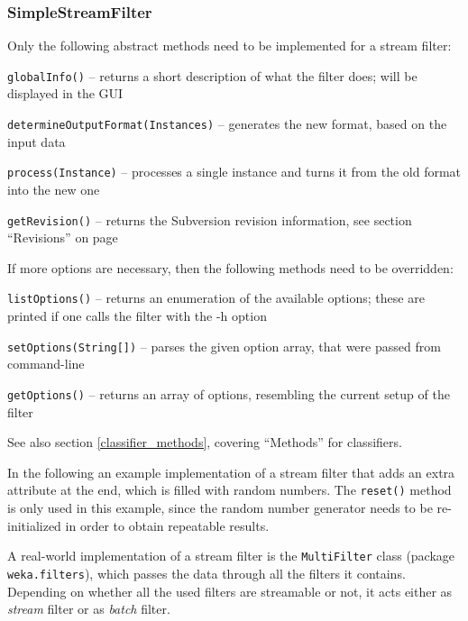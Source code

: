 \subsubsection{SimpleStreamFilter}
Only the following abstract methods need to be implemented for a stream filter:
\begin{tight_itemize}
  \item \texttt{globalInfo()} -- returns a short description of what the filter
does; will be displayed in the GUI
  \item \texttt{determineOutputFormat(Instances)} -- generates the new
format, based on the input data
  \item \texttt{process(Instance)} -- processes a single instance and turns it
from the old format into the new one
  \item \texttt{getRevision()} -- returns the Subversion revision
information, see section ``Revisions'' on page \pageref{filter_revisions}
\end{tight_itemize}
If more options are necessary, then the following methods need to be overridden:
\begin{tight_itemize}
  \item \texttt{listOptions()} -- returns an enumeration of the available
options; these are printed if one calls the filter with the -h option
  \item \texttt{setOptions(String[])} -- parses the given option array,
that were passed from command-line
  \item \texttt{getOptions()} -- returns an array of options, resembling the
current setup of the filter
\end{tight_itemize}
See also section \ref{classifier_methods}, covering ``Methods'' for classifiers.

\newpage
In the following an example implementation of a stream filter that adds an extra
attribute at the end, which is filled with random numbers. The \texttt{reset()}
method is only used in this example, since the random number generator needs to
be re-initialized in order to obtain repeatable results.

{\footnotesize }

\noindent A real-world implementation of a stream filter is the
\texttt{MultiFilter} class (package \texttt{weka.filters}), which passes the
data through all the filters it contains. Depending on whether all the used
filters are streamable or not, it acts either as \textit{stream} filter or as
\textit{batch} filter.

